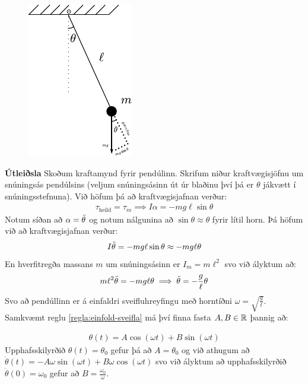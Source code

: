 \begin{minipage}{\linewidth}

\begin{figure}
\includegraphics[scale = 1.25]{figures/pendulum-2.pdf}
\end{figure}

\textbf{Útleiðsla} Skoðum kraftamynd fyrir pendúlinn. Skrifum niður kraftvægisjöfnu um snúningsás pendúlsins (veljum snúningsásinn út úr blaðinu því þá er $\theta$ jákvætt í snúningsstefnuna). Við höfum þá að kraftvægisjafnan verður:
\begin{align*}
    \tau_{\text{heild}} = \tau_{m} \implies I\alpha = -mg\ell \sin\theta
\end{align*}
Notum síðan að $\alpha = \Ddot{\theta}$ og notum nálgunina að $\sin\theta \approx \theta$ fyrir lítil horn. Þá höfum við að kraftvægisjafnan verður:
\begin{align*}
    I\Ddot{\theta} = -mg\ell \sin\theta \approx -mg\ell \theta
\end{align*}
En hverfitregða massans $m$ um snúningsásinn er $I_m = m\ell^2$ svo við ályktum að:
\begin{align*}
    m\ell^2 \Ddot{\theta} = -mg\ell\theta \implies \Ddot{\theta} = -\frac{g}{\ell}\theta
\end{align*}
Svo að pendúllinn er á einfaldri sveifluhreyfingu með horntíðni $\omega = \sqrt{\frac{g}{\ell}}$. Samkvæmt reglu \ref{regla:einfold-sveifla} má því finna fasta $A, B \in \mathbb{R}$ þannig að:
\end{minipage}
\begin{align*}
    \theta(t) = A\cos(\omega t) + B\sin(\omega t)
\end{align*}
Upphafsskilyrðið $\theta(t) = \theta_0$ gefur þá að $A = \theta_0$ og við athugum að $\dot{\theta}(t) = -A\omega \sin(\omega t) + B\omega \cos(\omega t)$ svo við ályktum að upphafsskilyrðið $\dot{\theta}(0) = \omega_0$ gefur að $B = \frac{\omega_0}{\omega}$.

